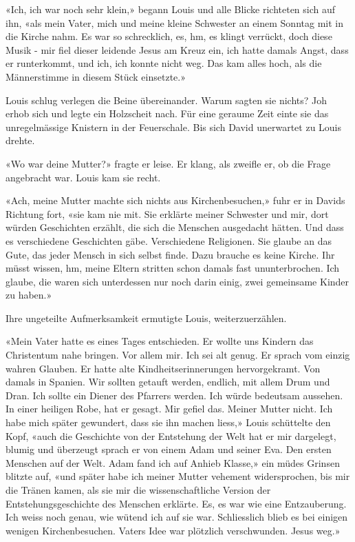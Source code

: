 «Ich, ich war noch sehr klein,» begann Louis und alle Blicke richteten
sich auf ihn, «als mein Vater, mich und meine kleine Schwester an einem
Sonntag mit in die Kirche nahm. Es war so schrecklich, es, hm,
es klingt verrückt, doch diese Musik - mir fiel dieser leidende Jesus am Kreuz ein,
ich hatte damals Angst, dass er runterkommt, und ich, ich konnte nicht
weg. Das kam alles hoch, als die Männerstimme in diesem Stück
einsetzte.»

Louis schlug verlegen die Beine übereinander. Warum sagten sie nichts? Joh erhob sich und legte ein Holzscheit nach. Für eine geraume Zeit
einte sie das unregelmässige Knistern in der Feuerschale.
Bis sich David unerwartet zu Louis drehte.

«Wo war deine Mutter?» fragte er leise. Er klang, als zweifle er, ob die
Frage angebracht war. Louis kam sie recht. 

«Ach, meine Mutter machte sich nichts aus Kirchenbesuchen,» fuhr er in Davids
Richtung fort, «sie kam nie mit. Sie erklärte meiner Schwester und mir,
dort würden Geschichten erzählt, die sich die Menschen ausgedacht
hätten. Und dass es verschiedene Geschichten gäbe. Verschiedene
Religionen. Sie glaube an das Gute, das jeder Mensch in sich selbst finde. Dazu brauche es keine Kirche.
Ihr müsst wissen, hm, meine Eltern stritten schon damals fast
ununterbrochen. Ich glaube, die waren sich unterdessen nur noch darin
einig, zwei gemeinsame Kinder zu haben.»

Ihre ungeteilte Aufmerksamkeit ermutigte Louis, weiterzuerzählen.

«Mein Vater hatte es eines Tages entschieden. Er wollte uns Kindern das
Christentum nahe bringen. Vor allem mir. Ich sei alt genug. Er sprach
vom einzig wahren Glauben. Er hatte alte Kindheitserinnerungen
hervorgekramt. Von damals in Spanien. Wir sollten getauft werden, endlich, mit allem Drum und Dran. Ich sollte ein Diener des Pfarrers
werden. Ich würde bedeutsam aussehen. In einer heiligen Robe, hat er
gesagt. Mir gefiel das. Meiner Mutter nicht. Ich habe mich später
gewundert, dass sie ihn machen liess,» Louis schüttelte den Kopf, «auch
die Geschichte von der Entstehung der Welt hat er mir dargelegt,
blumig und überzeugt sprach er von einem Adam und seiner Eva. Den ersten
Menschen auf der Welt. Adam fand ich auf Anhieb Klasse,» ein müdes Grinsen blitzte auf, «und später habe ich meiner Mutter vehement widersprochen, bis mir die Tränen kamen, als sie mir die wissenschaftliche Version der
Entstehungsgeschichte des Menschen erklärte. Es, es war wie eine
Entzauberung. Ich weiss noch genau, wie wütend ich auf sie war.
Schliesslich blieb es bei einigen wenigen Kirchenbesuchen. Vaters Idee
war plötzlich verschwunden. Jesus weg.»

